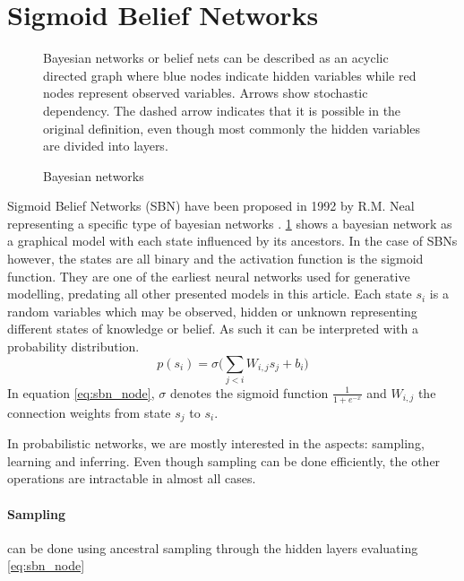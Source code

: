 \section{Sigmoid Belief Networks}
\label{sec:sbn}
\begin{figure}[htb]
\centering

  \caption{Bayesian networks}
  \label{fig:sbn_arch}
  \medskip
  \small
  Bayesian networks or belief nets can be described as an acyclic directed graph where blue nodes indicate hidden variables while red nodes represent observed variables.
  Arrows show stochastic dependency. The dashed arrow indicates that it is possible in the original definition, even though most commonly the hidden variables are divided into layers.
\end{figure}

Sigmoid Belief Networks (SBN) have been proposed in 1992 by R.M. Neal \cite{neal:1992} representing a specific type of bayesian networks \cite{pearl:1985}.
\ref{fig:sbn_arch} shows a bayesian network as a graphical model with each state influenced by its ancestors.
In the case of SBNs however, the states are all binary and the activation function is the sigmoid function. They are one of the earliest neural networks used for generative modelling, predating all other presented models in this article.
Each state $s_i$ is a random variables which may be observed, hidden or unknown representing different states of knowledge or belief. As such it can be interpreted with a probability distribution.
\begin{equation}
  \label{eq:sbn_node}
p(s_i) = \sigma\bigg(\sum_{j<i}W_{i,j}s_j+b_i\bigg)
\end{equation}
In equation \ref{eq:sbn_node}, $\sigma$ denotes the sigmoid function $\frac{1}{1 + e^{-x}}$ and $W_{i,j}$ the connection weights from state $s_j$ to $s_i$.

In probabilistic networks, we are mostly interested in the aspects: sampling, learning and inferring.
Even though sampling can be done efficiently, the other operations are intractable in almost all cases.
\paragraph{Sampling}
can be done using ancestral sampling through the hidden layers evaluating \ref{eq:sbn_node}


